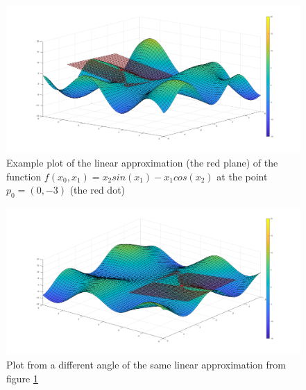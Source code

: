 \begin{figure}[ht]
\centering
\includegraphics[width=13cm]{figures/linear_approx1}
\caption[Linear approximation example 1]{Example plot of the linear approximation (the red plane) of the function $f\left(x_0, x_1\right) = x_2sin\left(x_1\right) - x_1cos\left(x_2\right)$ at the point $p_0 = \left(0, -3\right)$ (the red dot)}
\label{fig:linear_approx1}
\end{figure}
\begin{figure}[ht]
\centering
\includegraphics[width=13cm]{figures/linear_approx2}
\caption[Linear approximation example 2]{Plot from a different angle of the same linear approximation from figure \ref{fig:linear_approx1}}
\label{fig:linear_approx2}
\end{figure}

